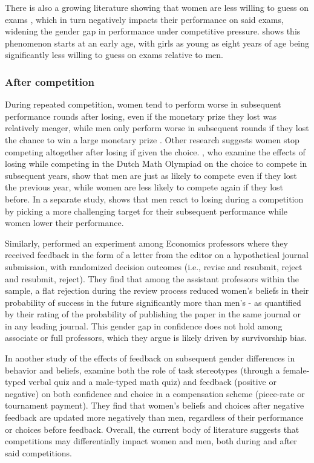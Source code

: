 \documentclass[a4paper, nobind]{templates/ociamthesis}
\begin{document}
There is also a growing literature showing that women are less willing to guess on exams \autocite{Pekkarinen2015,Baldiga2014,Iriberri2021}, which in turn negatively impacts their performance on said exams, widening the gender gap in performance under competitive pressure. \textcite{Riener2018} shows this phenomenon starts at an early age, with girls as young as eight years of age being significantly less willing to guess on exams relative to men.

\hypertarget{after-competition}{%
\subsubsection{After competition}\label{after-competition}}

During repeated competition, women tend to perform worse in subsequent performance rounds after losing, even if the monetary prize they lost was relatively meager, while men only perform worse in subsequent rounds if they lost the chance to win a large monetary prize \autocite{Gill2014}. Other research suggests women stop competing altogether after losing if given the choice. \textcite{Buser2019}, who examine the effects of losing while competing in the Dutch Math Olympiad on the choice to compete in subsequent years, show that men are just as likely to compete even if they lost the previous year, while women are less likely to compete again if they lost before. In a separate study, \textcite{Buser2016} shows that men react to losing during a competition by picking a more challenging target for their subsequent performance while women lower their performance.

Similarly, \textcite{Shastry2021} performed an experiment among Economics professors where they received feedback in the form of a letter from the editor on a hypothetical journal submission, with randomized decision outcomes (i.e., revise and resubmit, reject and resubmit, reject). They find that among the assistant professors within the sample, a flat rejection during the review process reduced women's beliefs in their probability of success in the future significantly more than men's - as quantified by their rating of the probability of publishing the paper in the same journal or in any leading journal. This gender gap in confidence does not hold among associate or full professors, which they argue is likely driven by survivorship bias.

In another study of the effects of feedback on subsequent gender differences in behavior and beliefs, \textcite{Coffman2021} examine both the role of task stereotypes (through a female-typed verbal quiz and a male-typed math quiz) and feedback (positive or negative) on both confidence and choice in a compensation scheme (piece-rate or tournament payment). They find that women's beliefs and choices after negative feedback are updated more negatively than men, regardless of their performance or choices before feedback. Overall, the current body of literature suggests that competitions may differentially impact women and men, both during and after said competitions.
\end{document}
